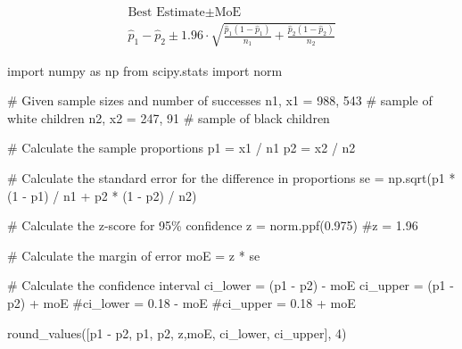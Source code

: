 \documentclass[
  letterpaper,
  DIV=11,
  numbers=noendperiod]{scrartcl}
\newenvironment{Shaded}{\begin{snugshade}}{\end{snugshade}}
\newcommand{\CommentTok}[1]{\textcolor[rgb]{0.37,0.37,0.37}{#1}}
\newcommand{\DecValTok}[1]{\textcolor[rgb]{0.68,0.00,0.00}{#1}}
\newcommand{\FloatTok}[1]{\textcolor[rgb]{0.68,0.00,0.00}{#1}}
\newcommand{\ImportTok}[1]{\textcolor[rgb]{0.00,0.46,0.62}{#1}}
\newcommand{\NormalTok}[1]{\textcolor[rgb]{0.00,0.23,0.31}{#1}}
\newcommand{\OperatorTok}[1]{\textcolor[rgb]{0.37,0.37,0.37}{#1}}
\begin{document}
\[
\begin{align*}
\text{Best Estimate} \pm \text{MoE} \\
\hat{p}_1 - \hat{p}_2 \pm 1.96 \cdot \sqrt{\frac{\hat{p}_1(1-\hat{p}_1)}{n_1} + \frac{\hat{p}_2(1-\hat{p}_2)}{n_2}}
\end{align*}
\]

\begin{Shaded}
\begin{Highlighting}[]
\ImportTok{import}\NormalTok{ numpy }\ImportTok{as}\NormalTok{ np}
\ImportTok{from}\NormalTok{ scipy.stats }\ImportTok{import}\NormalTok{ norm}

\CommentTok{\# Given sample sizes and number of successes}
\NormalTok{n1, x1 }\OperatorTok{=} \DecValTok{988}\NormalTok{, }\DecValTok{543} \CommentTok{\# sample of white children}
\NormalTok{n2, x2 }\OperatorTok{=} \DecValTok{247}\NormalTok{, }\DecValTok{91}  \CommentTok{\# sample of black children}


\CommentTok{\# Calculate the sample proportions}
\NormalTok{p1 }\OperatorTok{=}\NormalTok{ x1 }\OperatorTok{/}\NormalTok{ n1}
\NormalTok{p2 }\OperatorTok{=}\NormalTok{ x2 }\OperatorTok{/}\NormalTok{ n2}

\CommentTok{\# Calculate the standard error for the difference in proportions}
\NormalTok{se }\OperatorTok{=}\NormalTok{ np.sqrt(p1 }\OperatorTok{*}\NormalTok{ (}\DecValTok{1} \OperatorTok{{-}}\NormalTok{ p1) }\OperatorTok{/}\NormalTok{ n1 }\OperatorTok{+}\NormalTok{ p2 }\OperatorTok{*}\NormalTok{ (}\DecValTok{1} \OperatorTok{{-}}\NormalTok{ p2) }\OperatorTok{/}\NormalTok{ n2)}

\CommentTok{\# Calculate the z{-}score for 95\% confidence}
\NormalTok{z }\OperatorTok{=}\NormalTok{ norm.ppf(}\FloatTok{0.975}\NormalTok{)}
\CommentTok{\#z = 1.96}

\CommentTok{\# Calculate the margin of error}
\NormalTok{moE }\OperatorTok{=}\NormalTok{ z }\OperatorTok{*}\NormalTok{ se}

\CommentTok{\# Calculate the confidence interval}
\NormalTok{ci\_lower }\OperatorTok{=}\NormalTok{ (p1 }\OperatorTok{{-}}\NormalTok{ p2) }\OperatorTok{{-}}\NormalTok{ moE}
\NormalTok{ci\_upper }\OperatorTok{=}\NormalTok{ (p1 }\OperatorTok{{-}}\NormalTok{ p2) }\OperatorTok{+}\NormalTok{ moE}
\CommentTok{\#ci\_lower = 0.18 {-} moE}
\CommentTok{\#ci\_upper = 0.18 + moE}

\NormalTok{round\_values([p1 }\OperatorTok{{-}}\NormalTok{ p2, p1, p2, z,moE, ci\_lower, ci\_upper], }\DecValTok{4}\NormalTok{)}
\end{Highlighting}
\end{Shaded}
\end{document}
